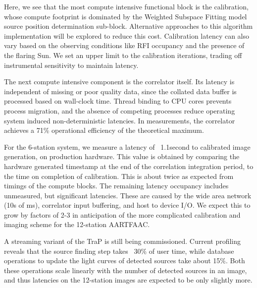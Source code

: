 \documentclass{ws-jai}
\begin{document}
Here,  we  see  that  the  most   compute  intensive  functional  block  is  the
calibration,  whose compute  footprint  is dominated  by  the Weighted  Subspace
Fitting model source position determination sub-block. Alternative approaches to
this algorithm implementation will be  explored to reduce this cost. Calibration
latency can also  vary based on the observing conditions  like RFI occupancy and
the  presence of  the flaring  Sun. We  set an  upper limit  to the  calibration
iterations, trading off instrumental sensitivity to maintain latency.

The next  compute intensive component is  the correlator itself. Its  latency is
independent of missing  or poor quality data, since the  collated data buffer is
processed based on wall-clock time. Thread binding to CPU cores prevents process
migration,  and  the absence  of  competing  processes reduce  operating  system
induced non-deterministic latencies. In  measurements, the correlator achieves a
71\% operational efficiency of the theoretical maximum.

For the 6-station system, we measure a latency of ~1.1second to calibrated image
generation,  on production  hardware. This  value is  obtained by  comparing the
hardware generated timestamp  at the end of the  correlation integration period,
to the time on  completion of calibration. This is about  twice as expected from
timings  of  the  compute  blocks.  The  remaining  latency  occupancy  includes
unmeasured,  but significant  latencies.   These  are caused  by  the wide  area
network (10s  of ms),  correlator input  buffering, and host  to device  I/O. We
expect this to  grow by factors of  2-3 in anticipation of  the more complicated
calibration and imaging scheme for the 12-station AARTFAAC.

A streaming variant  of the TraP is still being  commissioned. Current profiling
reveals that  the source finding step  takes ~30\% of user  time, while database
operations to update the light curves  of detected sources take about 15\%. Both
these operations scale linearly with the number of detected sources in an image,
and thus  latencies on the  12-station images are  expected to be  only slightly
more.\\

\end{document}
